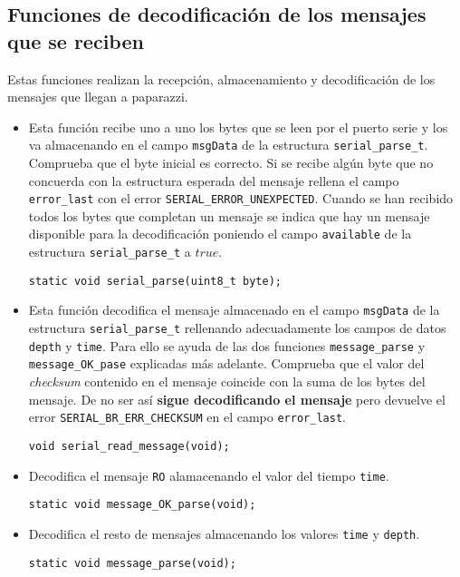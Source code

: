 \subsection{Funciones de decodificación de los mensajes que se reciben}

Estas funciones realizan la recepción, almacenamiento y decodificación de los mensajes que llegan a paparazzi.
\begin{itemize}
	\item Esta función recibe uno a uno los bytes que se leen por el puerto serie y los va almacenando en el campo \texttt{msgData} de la estructura \texttt{serial\_parse\_t}. Comprueba que el byte inicial es correcto. Si se recibe algún byte que no concuerda con la estructura esperada del mensaje rellena el campo \texttt{error\_last} con el error \texttt{SERIAL\_ERROR\_UNEXPECTED}. Cuando se han recibido todos los bytes que completan un mensaje se indica que hay un mensaje disponible para la decodificación poniendo el campo \texttt{available} de la estructura \texttt{serial\_parse\_t} a $true$.
	\begin{lstlisting}[style=C]
	static void serial_parse(uint8_t byte);
	\end{lstlisting}
	\item Esta función decodifica el mensaje almacenado en el campo \texttt{msgData} de la estructura \texttt{serial\_parse\_t} rellenando adecuadamente los campos de datos \texttt{depth} y \texttt{time}. Para ello se ayuda de las dos funciones \texttt{message\_parse} y \texttt{message\_OK\_pase} explicadas más adelante. Comprueba que el valor del \textit{checksum} contenido en el mensaje coincide con la suma de los bytes del mensaje. De no ser así \textbf{sigue decodificando el mensaje} pero devuelve el error \texttt{SERIAL\_BR\_ERR\_CHECKSUM} en el campo \texttt{error\_last}.
	\begin{lstlisting}[style=C]
	void serial_read_message(void);
	\end{lstlisting}
	\item Decodifica el mensaje \texttt{RO} alamacenando el valor del tiempo \texttt{time}.
	\begin{lstlisting}[style=C]
	static void message_OK_parse(void);
	\end{lstlisting}
	\item Decodifica el resto de mensajes almacenando los valores \texttt{time} y \texttt{depth}.
	\begin{lstlisting}[style=C]
	static void message_parse(void);
	\end{lstlisting}
	
\end{itemize}

